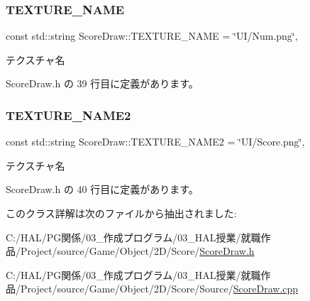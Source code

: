 \mbox{\label{class_score_draw_a6740fd10a056c8a0c88503c32599a18d}} 
\subsubsection{\texorpdfstring{T\+E\+X\+T\+U\+R\+E\+\_\+\+N\+A\+ME}{TEXTURE\_NAME}}
{\footnotesize\ttfamily const std\+::string Score\+Draw\+::\+T\+E\+X\+T\+U\+R\+E\+\_\+\+N\+A\+ME = \char`\"{}UI/Num.\+png\char`\"{}\hspace{0.3cm}{\ttfamily [static]}, {\ttfamily [private]}}



テクスチャ名 



 Score\+Draw.\+h の 39 行目に定義があります。

\mbox{\label{class_score_draw_a8fe0ac3639debfcda2422a92c61cc463}} 
\subsubsection{\texorpdfstring{T\+E\+X\+T\+U\+R\+E\+\_\+\+N\+A\+M\+E2}{TEXTURE\_NAME2}}
{\footnotesize\ttfamily const std\+::string Score\+Draw\+::\+T\+E\+X\+T\+U\+R\+E\+\_\+\+N\+A\+M\+E2 = \char`\"{}UI/Score.\+png\char`\"{}\hspace{0.3cm}{\ttfamily [static]}, {\ttfamily [private]}}



テクスチャ名 



 Score\+Draw.\+h の 40 行目に定義があります。



このクラス詳解は次のファイルから抽出されました\+:\begin{DoxyCompactItemize}
\item 
C\+:/\+H\+A\+L/\+P\+G関係/03\+\_\+作成プログラム/03\+\_\+\+H\+A\+L授業/就職作品/\+Project/source/\+Game/\+Object/2\+D/\+Score/\mbox{\hyperlink{_score_draw_8h}{Score\+Draw.\+h}}\item 
C\+:/\+H\+A\+L/\+P\+G関係/03\+\_\+作成プログラム/03\+\_\+\+H\+A\+L授業/就職作品/\+Project/source/\+Game/\+Object/2\+D/\+Score/\+Source/\mbox{\hyperlink{_score_draw_8cpp}{Score\+Draw.\+cpp}}\end{DoxyCompactItemize}
